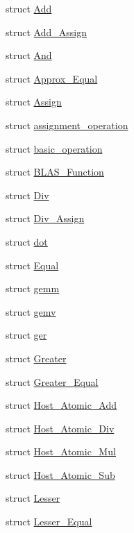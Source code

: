 \begin{DoxyCompactItemize}
\item 
struct \hyperlink{structBC_1_1oper_1_1Add}{Add}
\item 
struct \hyperlink{structBC_1_1oper_1_1Add__Assign}{Add\+\_\+\+Assign}
\item 
struct \hyperlink{structBC_1_1oper_1_1And}{And}
\item 
struct \hyperlink{structBC_1_1oper_1_1Approx__Equal}{Approx\+\_\+\+Equal}
\item 
struct \hyperlink{structBC_1_1oper_1_1Assign}{Assign}
\item 
struct \hyperlink{structBC_1_1oper_1_1assignment__operation}{assignment\+\_\+operation}
\item 
struct \hyperlink{structBC_1_1oper_1_1basic__operation}{basic\+\_\+operation}
\item 
struct \hyperlink{structBC_1_1oper_1_1BLAS__Function}{B\+L\+A\+S\+\_\+\+Function}
\item 
struct \hyperlink{structBC_1_1oper_1_1Div}{Div}
\item 
struct \hyperlink{structBC_1_1oper_1_1Div__Assign}{Div\+\_\+\+Assign}
\item 
struct \hyperlink{structBC_1_1oper_1_1dot}{dot}
\item 
struct \hyperlink{structBC_1_1oper_1_1Equal}{Equal}
\item 
struct \hyperlink{structBC_1_1oper_1_1gemm}{gemm}
\item 
struct \hyperlink{structBC_1_1oper_1_1gemv}{gemv}
\item 
struct \hyperlink{structBC_1_1oper_1_1ger}{ger}
\item 
struct \hyperlink{structBC_1_1oper_1_1Greater}{Greater}
\item 
struct \hyperlink{structBC_1_1oper_1_1Greater__Equal}{Greater\+\_\+\+Equal}
\item 
struct \hyperlink{structBC_1_1oper_1_1Host__Atomic__Add}{Host\+\_\+\+Atomic\+\_\+\+Add}
\item 
struct \hyperlink{structBC_1_1oper_1_1Host__Atomic__Div}{Host\+\_\+\+Atomic\+\_\+\+Div}
\item 
struct \hyperlink{structBC_1_1oper_1_1Host__Atomic__Mul}{Host\+\_\+\+Atomic\+\_\+\+Mul}
\item 
struct \hyperlink{structBC_1_1oper_1_1Host__Atomic__Sub}{Host\+\_\+\+Atomic\+\_\+\+Sub}
\item 
struct \hyperlink{structBC_1_1oper_1_1Lesser}{Lesser}
\item 
struct \hyperlink{structBC_1_1oper_1_1Lesser__Equal}{Lesser\+\_\+\+Equal}

\end{DoxyCompactItemize}

